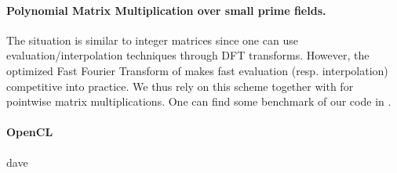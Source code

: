 %
\paragraph{Polynomial Matrix Multiplication over small prime fields.}
The situation is similar to integer matrices since one can use evaluation/interpolation techniques through DFT transforms. However, the optimized Fast Fourier Transform of \cite{Harvey:2014}  makes fast evaluation (resp. interpolation) competitive into practice. We thus rely on this scheme together with \fgemm for pointwise matrix multiplications. One can find some benchmark of our code in \cite{GioLeb14}.

\paragraph{OpenCL}
%
\danger dave  
